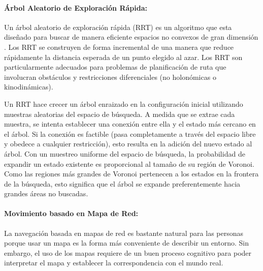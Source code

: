 \paragraph{Árbol Aleatorio de Exploración Rápida:} %
Un árbol aleatorio de exploración rápida (RRT) es un algoritmo que esta 
diseñado para buscar de manera eficiente espacios no convexos de gran 
dimensión \cite{bry2011rapidly}. Los RRT se construyen de forma incremental 
de una manera que reduce rápidamente la distancia esperada de un punto elegido 
al azar. Los RRT son particularmente adecuados para problemas de planificación 
de ruta que involucran obstáculos y restricciones diferenciales (no holonómicas 
o kinodinámicas).

Un RRT hace crecer un árbol enraizado en la configuración inicial utilizando 
muestras aleatorias del espacio de búsqueda. A medida que se extrae cada 
muestra, se intenta establecer una conexión entre ella y el estado más cercano 
en el árbol. Si la conexión es factible (pasa completamente a través del espacio 
libre y obedece a cualquier restricción), esto resulta en la adición del nuevo 
estado al árbol. Con un muestreo uniforme del espacio de búsqueda, la 
probabilidad de expandir un estado existente es proporcional al tamaño de su 
región de Voronoi. Como las regiones más grandes de Voronoi pertenecen a los 
estados en la frontera de la búsqueda, esto significa que el árbol se expande 
preferentemente hacia grandes áreas no buscadas. 

\paragraph{Movimiento basado en Mapa de Red:} %
\label{sec:MapRed}
La navegación basada en mapas de red es bastante natural para las personas 
porque usar un mapa es la forma más conveniente de describir un entorno. Sin 
embargo, el uso de los mapas requiere de un buen proceso cognitivo para poder 
interpretar el mapa y establecer la correspondencia con el mundo real.

